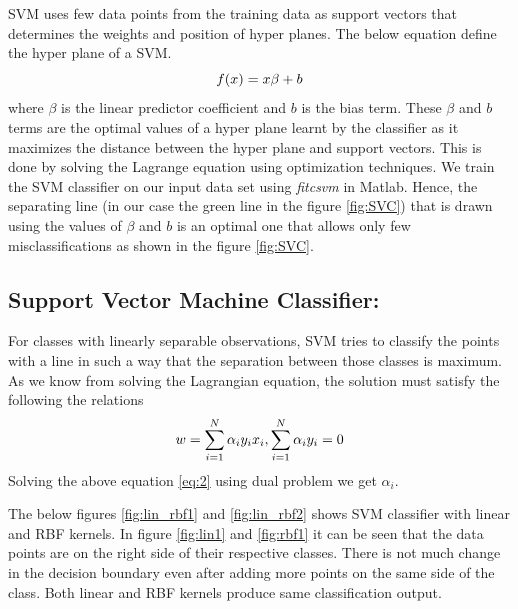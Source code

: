 {	 SVM uses few data points from the training data as support vectors that determines the weights and position of hyper planes. The below equation define the hyper plane of a SVM.
	 \begin{equation}\label{eq:1}
	 \centering
	 f(x)=x{\beta}+b
	 \end{equation}
	  where $\beta$ is the linear predictor coefficient and $b$ is the bias term.  These $\beta$ and $b$ terms are the optimal values of a hyper plane learnt by the classifier as it maximizes the distance between the hyper plane and support vectors. This is done by solving the Lagrange equation using optimization techniques. We train the SVM classifier on our input data set using {\textit{ fitcsvm}} in Matlab. 
	  Hence, the separating line (in our case the green line in the figure \ref{fig:SVC}) that is drawn using the values of $\beta$ and $b$ is an optimal one that allows only few misclassifications as shown in the figure \ref{fig:SVC}.  
	  \subsection{Support Vector Machine Classifier:}	
	  For classes with linearly separable observations, SVM tries to classify the points with a line in such a way that the separation between those classes is maximum.
	  As we know from solving the Lagrangian equation, the solution must satisfy the following the relations
	  \begin{equation}\label{eq:2}
	  \centering
	  w = \sum_{i=1}^{N} \alpha_i y_i x_i , \sum_{i=1}^{N} \alpha_i y_i = 0
	  \end{equation}
	  Solving the above equation \ref{eq:2} using dual problem we get $\alpha_i$.

	   The below figures \ref{fig:lin_rbf1} and \ref{fig:lin_rbf2} shows SVM classifier with linear and RBF kernels. In figure \ref{fig:lin1} and \ref{fig:rbf1} it can be seen that the data points are on the right side of their respective classes. There is not much change in the decision boundary even after adding more points on the same side of the class. Both linear and RBF kernels produce same classification output.
	   

}
